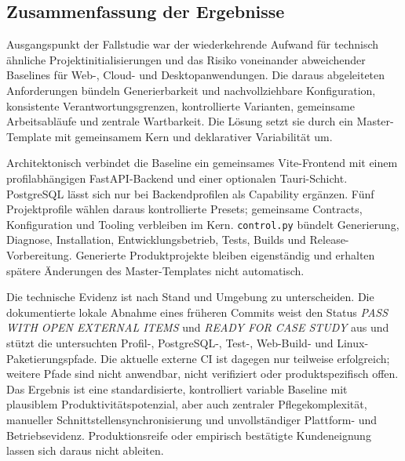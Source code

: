 \subsection{Zusammenfassung der Ergebnisse}
\label{subsec:zusammenfassung-ergebnisse}

Ausgangspunkt der Fallstudie war der wiederkehrende Aufwand für technisch
ähnliche Projektinitialisierungen und das Risiko voneinander abweichender
Baselines für Web-, Cloud- und Desktopanwendungen. Die daraus abgeleiteten
Anforderungen bündeln Generierbarkeit und nachvollziehbare Konfiguration,
konsistente Verantwortungsgrenzen, kontrollierte Varianten, gemeinsame
Arbeitsabläufe und zentrale Wartbarkeit. Die Lösung setzt sie durch ein
Master-Template mit gemeinsamem Kern und deklarativer Variabilität um.

Architektonisch verbindet die Baseline ein gemeinsames Vite-Frontend mit einem
profilabhängigen FastAPI-Backend und einer optionalen Tauri-Schicht.
PostgreSQL lässt sich nur bei Backendprofilen als Capability ergänzen. Fünf
Projektprofile wählen daraus kontrollierte Presets; gemeinsame Contracts,
Konfiguration und Tooling verbleiben im Kern. \texttt{control.py} bündelt
Generierung, Diagnose, Installation, Entwicklungsbetrieb, Tests, Builds und
Release-Vorbereitung. Generierte Produktprojekte bleiben eigenständig und
erhalten spätere Änderungen des Master-Templates nicht automatisch.

Die technische Evidenz ist nach Stand und Umgebung zu unterscheiden. Die
dokumentierte lokale Abnahme eines früheren Commits weist den Status
\emph{PASS WITH OPEN EXTERNAL ITEMS} und \emph{READY FOR CASE STUDY} aus und
stützt die untersuchten Profil-, PostgreSQL-, Test-, Web-Build- und
Linux-Paketierungspfade. Die aktuelle externe CI ist dagegen nur teilweise
erfolgreich; weitere Pfade sind nicht anwendbar, nicht verifiziert oder
produktspezifisch offen. Das Ergebnis ist eine standardisierte, kontrolliert
variable Baseline mit plausiblem Produktivitätspotenzial, aber auch zentraler
Pflegekomplexität, manueller Schnittstellensynchronisierung und unvollständiger
Plattform- und Betriebsevidenz. Produktionsreife oder empirisch bestätigte
Kundeneignung lassen sich daraus nicht ableiten.
